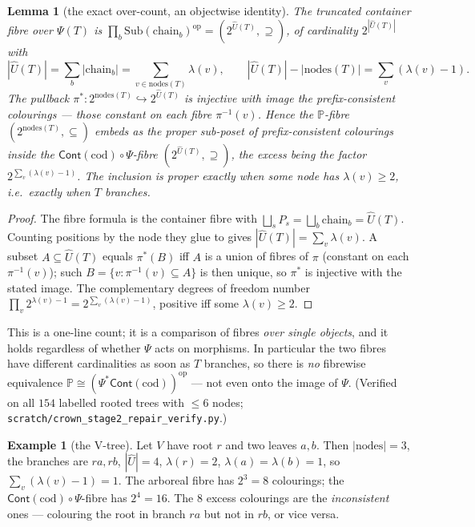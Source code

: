 \documentclass[11pt]{article}
\newtheorem{lemma}[theorem]{Lemma}
\theoremstyle{definition}
\newtheorem{example}[theorem]{Example}
\newcommand{\Cont}{\mathsf{Cont}}
\newcommand{\Sub}{\mathrm{Sub}}
\newcommand{\cod}{\mathrm{cod}}
\newcommand{\nodes}{\mathrm{nodes}}
\newcommand{\op}{\mathrm{op}}
\newcommand{\Pfib}{\mathbb{P}}
\newcommand{\Uf}{\widehat{U}}
\newcommand{\inpr}{\hookrightarrow}
\begin{document}
\begin{lemma}[the exact over-count, an objectwise identity]\label{lem:overcount}
The truncated container fibre over $\Psi(T)$ is $\prod_b\Sub(\mathrm{chain}_b)^\op=(2^{\Uf(T)},
\supseteq)$, of cardinality $2^{|\Uf(T)|}$ with
\[
|\Uf(T)|=\sum_b|\mathrm{chain}_b|=\sum_{v\in\nodes(T)}\lambda(v),
\qquad
|\Uf(T)|-|\nodes(T)|=\sum_v(\lambda(v)-1).
\]
The pullback $\pi^*\colon 2^{\nodes(T)}\inpr 2^{\Uf(T)}$ is injective with image the
\emph{prefix-consistent} colourings --- those constant on each fibre $\pi^{-1}(v)$. Hence the
$\Pfib$-fibre $(2^{\nodes(T)},\subseteq)$ embeds as the proper sub-poset of prefix-consistent
colourings inside the $\Cont(\cod)\circ\Psi$-fibre $(2^{\Uf(T)},\supseteq)$, the excess being the
factor $2^{\sum_v(\lambda(v)-1)}$. The inclusion is proper exactly when some node has
$\lambda(v)\ge 2$, i.e.\ exactly when $T$ branches.
\end{lemma}

\begin{proof}
The fibre formula is the container fibre with $\bigsqcup_s P_s=\bigsqcup_b\mathrm{chain}_b=\Uf(T)$.
Counting positions by the node they glue to gives $|\Uf(T)|=\sum_v\lambda(v)$. A subset
$A\subseteq\Uf(T)$ equals $\pi^*(B)$ iff $A$ is a union of fibres of $\pi$ (constant on each
$\pi^{-1}(v)$); such $B=\{v:\pi^{-1}(v)\subseteq A\}$ is then unique, so $\pi^*$ is injective with
the stated image. The complementary degrees of freedom number $\prod_v2^{\lambda(v)-1}
=2^{\sum_v(\lambda(v)-1)}$, positive iff some $\lambda(v)\ge2$.
\end{proof}

This is a one-line count; it is a comparison of fibres \emph{over single objects}, and it holds
regardless of whether $\Psi$ acts on morphisms. In particular the two fibres have different
cardinalities as soon as $T$ branches, so there is \emph{no} fibrewise equivalence
$\Pfib\cong(\Psi^*\Cont(\cod))^\op$ --- not even onto the image of $\Psi$. (Verified on all $154$
labelled rooted trees with $\le6$ nodes; \texttt{scratch/crown\_stage2\_repair\_verify.py}.)

\begin{example}[the V-tree]\label{ex:v}
Let $V$ have root $r$ and two leaves $a,b$. Then $|\nodes|=3$, the branches are $ra,rb$, $|\Uf|=4$,
$\lambda(r)=2$, $\lambda(a)=\lambda(b)=1$, so $\sum_v(\lambda(v)-1)=1$. The arboreal fibre has
$2^3=8$ colourings; the $\Cont(\cod)\circ\Psi$-fibre has $2^4=16$. The $8$ excess colourings are the
\emph{inconsistent} ones --- colouring the root in branch $ra$ but not in $rb$, or vice versa.
\end{example}
\end{document}
